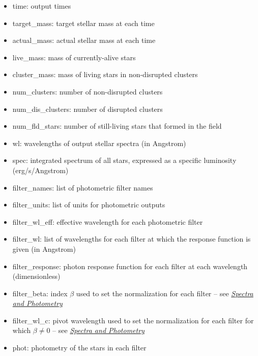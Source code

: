 \documentclass[letterpaper,10pt,english]{sphinxmanual}
\begin{document}
\begin{itemize}
\item {} 
time: output times

\item {} 
target\_mass: target stellar mass at each time

\item {} 
actual\_mass: actual stellar mass at each time

\item {} 
live\_mass: mass of currently-alive stars

\item {} 
cluster\_mass: mass of living stars in non-disrupted clusters

\item {} 
num\_clusters: number of non-disrupted clusters

\item {} 
num\_dis\_clusters: number of disrupted clusters

\item {} 
num\_fld\_stars: number of still-living stars that formed in the field

\item {} 
wl: wavelengths of output stellar spectra (in Angstrom)

\item {} 
spec: integrated spectrum of all stars, expressed as a specific luminosity (erg/s/Angstrom)

\item {} 
filter\_names: list of photometric filter names

\item {} 
filter\_units: list of units for photometric outputs

\item {} 
filter\_wl\_eff: effective wavelength for each photometric filter

\item {} 
filter\_wl: list of wavelengths for each filter at which the response function is given (in Angstrom)

\item {} 
filter\_response: photon response function for each filter at each wavelength (dimensionless)

\item {} 
filter\_beta: index \(\beta\) used to set the normalization for each filter -- see {\hyperref[intro:ssec-spec-phot]{\emph{Spectra and Photometry}}}

\item {} 
filter\_wl\_c: pivot wavelength used to set the normalization for each filter for which \(\beta \neq 0\) -- see {\hyperref[intro:ssec-spec-phot]{\emph{Spectra and Photometry}}}

\item {} 
phot: photometry of the stars in each filter

\end{itemize}
\end{document}
